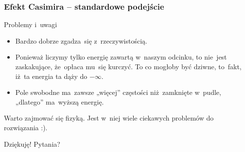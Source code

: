 \documentclass[10pt,t]{beamer}
\begin{document}
\begin{frame}
  \frametitle{Efekt Casimira -- standardowe podejście}


  Problemy i~uwagi
  \begin{itemize}
    \RaggedRight

  \item Bardzo dobrze zgadza~się z~rzeczywistością.

  \item Ponieważ liczymy tylko energię zawartą w~naszym odcinku,
    to nie~jest zaskakujące, że~opłaca mu~się kurczyć. To co mogłoby
    być dziwne, to~fakt, iż~ta energia ta dąży do $-\infty$.

  \item Pole swobodne ma~zawsze „więcej” częstości niż~zamknięte
    w~pudle, „dlatego” ma~wyższą energię.

  \end{itemize}

\end{frame}










\appendix





\begin{frame}[standout]


  { \color{jFrametitleFGColor} Warto zajmować się fizyką. Jest w~niej
    wiele ciekawych problemów do rozwiązania :). }

  \vspace{3em}



  { \Large \color{jFrametitleFGColor} Dziękuję! Pytania? }

\end{frame}
\end{document}
